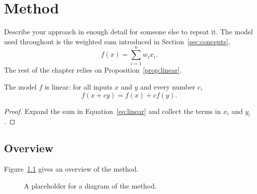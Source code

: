 \chapter{Method}
\label{ch:method}

Describe your approach in enough detail for someone else to repeat it.
The model used throughout is the weighted sum introduced in
Section~\ref{sec:concepts},
\begin{equation}
  f(x) = \sum_{i=1}^{n} w_i x_i .
  \label{eq:model}
\end{equation}
The rest of the chapter relies on Proposition~\ref{prop:linear}.

\begin{proposition}
\label{prop:linear}
The model $f$ is linear: for all inputs $x$ and $y$ and every number $c$,
\begin{equation}
  f(x + c y) = f(x) + c f(y) .
  \label{eq:linear}
\end{equation}
\end{proposition}

\begin{proof}
Expand the sum in Equation~\eqref{eq:linear} and collect the terms in
$x_i$ and $y_i$.
\end{proof}

\section{Overview}
\label{sec:overview}

Figure~\ref{fig:method} gives an overview of the method.

\begin{figure}[htbp]
  \centering
  \caption{A placeholder for a diagram of the method.}
  \label{fig:method}
\end{figure}
